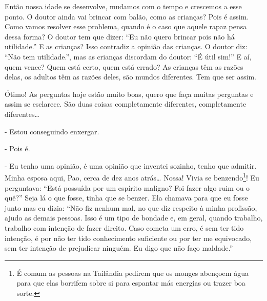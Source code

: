Então nossa idade se desenvolve, mudamos com o tempo e crescemos a
esse ponto. O doutor ainda vai brincar com balão, como as crianças?
Pois é assim. Como vamos resolver esse problema, quando é o caso que
aquele rapaz pensa dessa forma? O doutor tem que dizer: “Eu não quero
brincar pois não há utilidade.” E as crianças? Isso contradiz a opinião
das crianças. O doutor diz: “Não tem utilidade.”, mas as crianças
discordam do doutor: “É útil sim!” E aí, quem vence? Quem está certo,
quem está errado? As crianças têm as razões delas, os adultos têm as
razões deles, são mundos diferentes. Tem que ser assim. 

Ótimo! As perguntas hoje estão muito boas, quero que faça muitas
perguntas e assim se esclarece. São duas coisas completamente
diferentes, completamente diferentes…

{}- Estou conseguindo enxergar.

{}- Pois é. 

{}- Eu tenho uma opinião, é uma opinião que inventei sozinho, tenho
que admitir. Minha esposa aqui, Pao, cerca de dez anos atrás… Nossa!
Vivia se benzendo\footnote{É comum as pessoas na Tailândia pedirem que
os monges abençoem água para que elas borrifem sobre si para espantar
más energias ou trazer boa sorte.}! Eu perguntava: “Está possuída por
um espírito maligno? Foi fazer algo ruim ou o quê?” Seja lá o que
fosse, tinha que se benzer. Ela chamava para que eu fosse junto mas eu
dizia: “Não fiz nenhum mal, no que diz respeito à minha profissão,
ajudo as demais pessoas. Isso é um tipo de bondade e, em geral, quando
trabalho, trabalho com intenção de fazer direito. Caso cometa um erro,
é sem ter tido intenção, é por não ter tido conhecimento suficiente ou
por ter me equivocado, sem ter intenção de prejudicar ninguém. Eu digo
que não faço maldade.”

